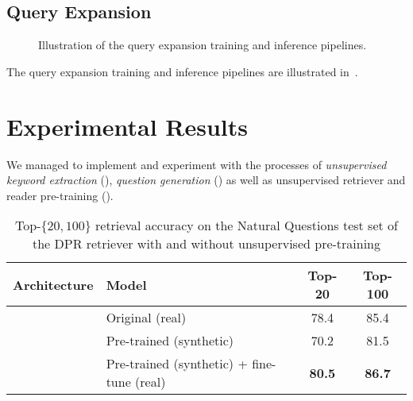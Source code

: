 \subsection{Query Expansion}
\label{sec:query_expansion_submethod}



\begin{figure}[!ht]
	\centering
	
	\vspace{0.5cm}
	
	\caption[Illustration of the query expansion training and inference pipelines.]{
		Illustration of the query expansion training and inference pipelines.
	}
	\label{fig:query_expansion_pipeline}
\end{figure}


The query expansion training and inference pipelines are illustrated in~.


\section{Experimental Results}
\label{sec:query_expansion_results}


We managed to implement and experiment with the processes of \emph{unsupervised keyword extraction} (), \emph{question generation} () as well as unsupervised retriever and reader pre-training ().

\begin{table*}[t!]
	\setlength\tabcolsep{5pt}
	\centering
	\small
	\begin{tabular}{ll|cc}
		\toprule
		\textbf{Architecture} & \textbf{Model}
		& Top-20 & Top-100 \\ 
		\midrule
		\multirow{3}{*}{\shortstack{DPR retriever~\cite{karpukhin2020dense}}} 
		& Original (real) & 78.4 & 85.4  \\
		& Pre-trained (synthetic) & 70.2 & 81.5 \\
		& Pre-trained (synthetic) + fine-tune (real) & \textbf{80.5} & \textbf{86.7} \\
		\bottomrule
	\end{tabular}
	\caption[Top-$\{20, 100\}$ retrieval accuracy on the Natural Questions test set of the DPR retriever with and without unsupervised pre-training.]{
		Top-$\{20, 100\}$ retrieval accuracy on the Natural Questions test set of the DPR retriever with and without unsupervised pre-training
	}
	
	\label{tab:retriever_unsupervised_pretraining}
\end{table*}



